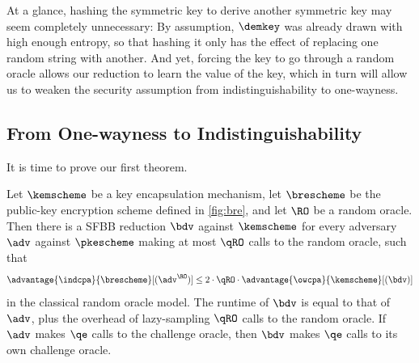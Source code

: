  At a glance, hashing the symmetric key to derive another symmetric key may seem completely
    unnecessary: By assumption, $\demkey$ was already drawn with
    high enough entropy, so that hashing it only has the effect of replacing
    one random string with another. And yet, forcing the key to go through
    a random oracle allows our reduction to learn the value of the key,
    which in turn will allow us to weaken the security assumption
    from indistinguishability to one-wayness. 

  \subsection{From One-wayness to Indistinguishability}\label{sec:bre-classical}
    It is time to prove our first theorem.

    \newcommand{\pkeEve}{\adv}
    \newcommand{\kemRed}{\bdv}
    \begin{theorem}\label{thm:bre-classical}
      Let $\kemscheme$ be a key encapsulation mechanism, let $\brescheme$ be the
      public-key encryption scheme defined in \cref{fig:bre}, and let $\RO$ be a random oracle. 
      Then there is a SFBB reduction $\kemRed$ against $\kemscheme$ 
      for every adversary $\pkeEve$ against $\pkescheme$ making at most $\qRO$
      calls to the random oracle, such that
      \[
        \advantage{\indcpa}{\brescheme}[(\pkeEve^{\RO})]
        \leq 2\cdot\qRO\cdot \advantage{\owcpa}{\kemscheme}[(\kemRed)]
      \]
      in the classical random oracle model. The runtime of $\kemRed$ is equal
      to that of $\pkeEve$, plus the overhead of lazy-sampling $\qRO$ calls to
      the random oracle. 
      If $\pkeEve$ makes $\qe$ calls to the challenge
      oracle, then $\kemRed$ makes $\qe$ calls to its own challenge oracle.
    \end{theorem}

    
